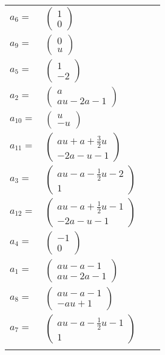 \documentclass[1p]{elsarticle_modified}
\theoremstyle{definition}
\begin{document}
\begin{tabular}{m{7pt} m{180pt} m{7pt} m{180pt} }
\flushright $a_{6}=$&$\begin{pmatrix}1\\0\end{pmatrix}$ \\
\flushright $a_{9}=$&$\begin{pmatrix}0\\u\end{pmatrix}$ \\
\flushright $a_{5}=$&$\begin{pmatrix}1\\-2\end{pmatrix}$ \\
\flushright $a_{2}=$&$\begin{pmatrix}a\\a u-2 a-1\end{pmatrix}$ \\
\flushright $a_{10}=$&$\begin{pmatrix}u\\- u\end{pmatrix}$ \\
\flushright $a_{11}=$&$\begin{pmatrix}a u+a+\frac{3}{2} u\\-2 a- u-1\end{pmatrix}$ \\
\flushright $a_{3}=$&$\begin{pmatrix}a u- a-\frac{1}{2} u-2\\1\end{pmatrix}$ \\
\flushright $a_{12}=$&$\begin{pmatrix}a u- a+\frac{1}{2} u-1\\-2 a- u-1\end{pmatrix}$ \\
\flushright $a_{4}=$&$\begin{pmatrix}-1\\0\end{pmatrix}$ \\
\flushright $a_{1}=$&$\begin{pmatrix}a u- a-1\\a u-2 a-1\end{pmatrix}$ \\
\flushright $a_{8}=$&$\begin{pmatrix}a u- a-1\\- a u+1\end{pmatrix}$ \\
\flushright $a_{7}=$&$\begin{pmatrix}a u- a-\frac{1}{2} u-1\\1\end{pmatrix}$\\&\end{tabular}
\end{document}
